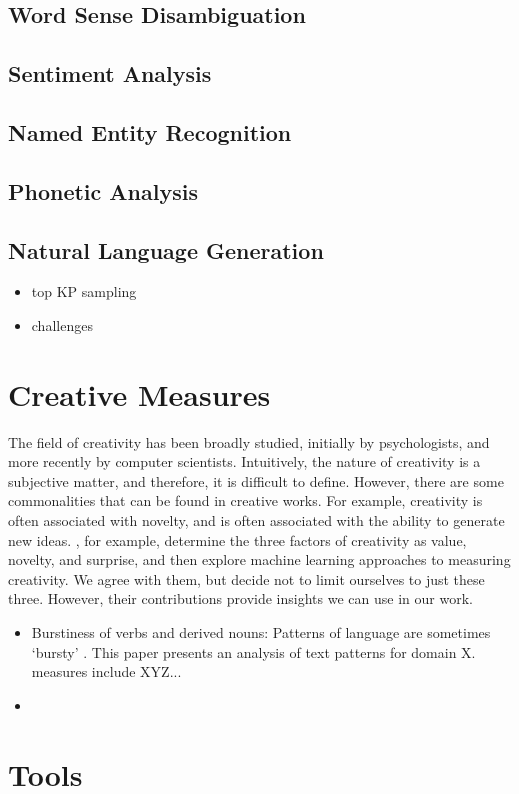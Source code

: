 \subsection{Word Sense Disambiguation}

\subsection{Sentiment Analysis}

\subsection{Named Entity Recognition}

\subsection{Phonetic Analysis}

\subsection{Natural Language Generation}
\begin{itemize}
    \item top KP sampling
    \item challenges 
\end{itemize}


\section{Creative Measures}
The field of creativity has been broadly studied, initially by psychologists, and more recently by computer scientists. 
Intuitively, the nature of creativity is a subjective matter, and therefore, it is difficult to define. However, there are some commonalities that can be found in creative works. For example, creativity is often associated with novelty, and is often associated with the ability to generate new ideas. \cite{franceschelli_deepcreativity_2022}, for example, determine the three factors of creativity as value, novelty, and surprise, and then explore machine learning approaches to measuring creativity. We agree with them, but decide not to limit ourselves to just these three. However, their contributions provide insights we can use in our work.  
\begin{itemize}
    \item Burstiness of verbs and derived nouns: Patterns of language are sometimes `bursty' \cite{pierrehumbert_burstiness_2012}. This paper presents an analysis of text patterns for domain X. measures include XYZ...
    \item 
\end{itemize}

\section{Tools}
